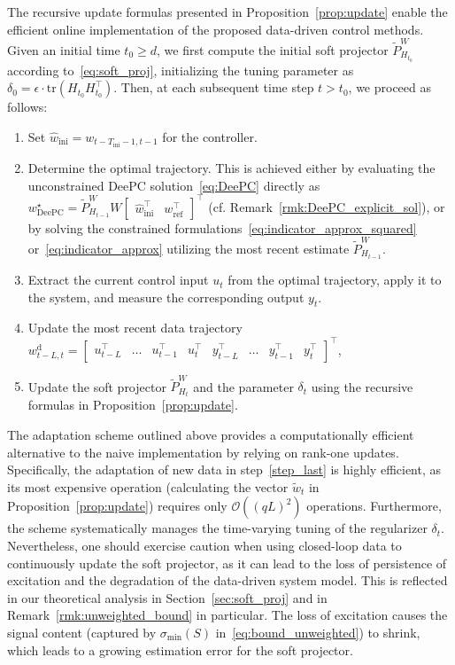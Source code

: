 \documentclass[letterpaper, 10 pt, conference]{ieeeconf}
\begin{document}
The recursive update formulas presented in Proposition~\ref{prop:update} enable the efficient online implementation of the proposed data-driven control methods. 
Given an initial time $t_0 \geq d$, we first compute the initial soft projector $\tilde{P}_{H_{t_0}}^W$ according to~\eqref{eq:soft_proj}, initializing the tuning parameter as $\delta_0 = \epsilon \cdot \mathrm{tr}(H_{t_0}H_{t_0}^\top)$. 
Then, at each subsequent time step $t > t_0$, we proceed as follows:
\begin{enumerate}[leftmargin=*]
    \item Set $\hat{w}_\mathrm{ini} = w_{t-T_\mathrm{ini}-1,t-1}$ for the controller.
    \item \label{step1} Determine the optimal trajectory. This is achieved either by evaluating the unconstrained \gls{DeePC} solution~\eqref{eq:DeePC} directly as $w^\star_\mathrm{DeePC} = \tilde{P}^W_{H_{t-1}} W\begin{bmatrix}
    \hat{w}_\mathrm{ini}^\top & w_\mathrm{ref}^\top
\end{bmatrix}^\top$ (cf. Remark~\ref{rmk:DeePC_explicit_sol}), or by solving the constrained formulations~\eqref{eq:indicator_approx_squared} or~\eqref{eq:indicator_approx} utilizing the most recent estimate $\tilde{P}_{H_{t-1}}^W$.
    \item Extract the current control input $u_{t}$ from the optimal trajectory, apply it to the system, and measure the corresponding output $y_{t}$.
    \item Update the most recent data trajectory $w^\mathrm{d}_{t-L,t} = \begin{bmatrix}
        u_{t-L}^\top & \dots & u_{t-1}^\top & u_{t}^\top & y_{t-L}^\top & \dots & y_{t-1}^\top & y_{t}^\top
    \end{bmatrix}^\top$,
    \item \label{step_last} Update the soft projector $\tilde{P}_{H_t}^W$ and the parameter $\delta_t$ using the recursive formulas in Proposition~\ref{prop:update}.
\end{enumerate}


The adaptation scheme outlined above provides a computationally efficient alternative to the naive implementation by relying on rank-one updates.
Specifically, the adaptation of new data in step~\ref{step_last} is highly efficient, as its most expensive operation (calculating the vector $\tilde{w}_t$ in Proposition~\ref{prop:update}) requires only $\mathcal{O}((qL)^2)$ operations.
Furthermore, the scheme systematically manages the time-varying tuning of the regularizer $\delta_t$.
Nevertheless, one should exercise caution when using closed-loop data to continuously update the soft projector, as it can lead to the loss of persistence of excitation and the degradation of the data-driven system model.
This is reflected in our theoretical analysis in Section~\ref{sec:soft_proj} and in Remark~\ref{rmk:unweighted_bound} in particular.
The loss of excitation causes the signal content (captured by $\sigma_{\min}(S)$ in~\eqref{eq:bound_unweighted}) to shrink, which leads to a growing estimation error for the soft projector.
\end{document}
